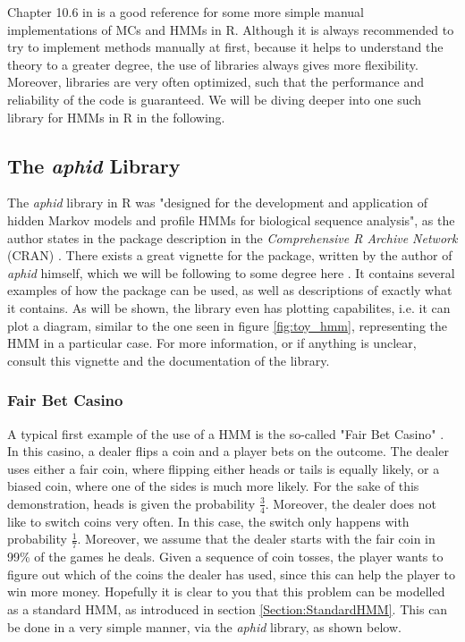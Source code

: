 \documentclass{article}\usepackage[]{graphicx}\usepackage[]{color}
\begin{document}
Chapter 10.6 in \cite{Krijnen2009} is a good reference for some more simple manual implementations of MCs and HMMs in R. Although it is always recommended to try to implement methods manually at first, because it helps to understand the theory to a greater degree, the use of libraries always gives more flexibility. Moreover, libraries are very often optimized, such that the performance and reliability of the code is guaranteed. We will be diving deeper into one such library for HMMs in R in the following. 

\subsection{The \textit{aphid} Library}

The \textit{aphid} library in R was "designed for the development and application of hidden Markov models and profile HMMs for biological sequence analysis", as the author states in the package description in the \textit{Comprehensive R Archive Network} (CRAN) \cite{CRAN}. There exists a great vignette for the package, written by the author of \textit{aphid}  himself, which we will be following to some degree here \cite{Wilkinson2017}. It contains several examples of how the package can be used, as well as descriptions of exactly what it contains. As will be shown, the library even has plotting capabilites, i.e. it can plot a diagram, similar to the one seen in figure \ref{fig:toy_hmm}, representing the HMM in a particular case. For more information, or if anything is unclear, consult this vignette and the documentation of the library. 

\subsubsection{Fair Bet Casino}
A typical first example of the use of a HMM is the so-called "Fair Bet Casino" \cite{Jones2004}. In this casino, a dealer flips a coin and a player bets on the outcome. The dealer uses either a fair coin, where flipping either heads or tails is equally likely, or a biased coin, where one of the sides is much more likely. For the sake of this demonstration, heads is given the probability $\frac34$. Moreover, the dealer does not like to switch coins very often. In this case, the switch only happens with probability $\frac17$. Moreover, we assume that the dealer starts with the fair coin in 99\% of the games he deals. Given a sequence of coin tosses, the player wants to figure out which of the coins the dealer has used, since this can help the player to win more money. Hopefully it is clear to you that this problem can be modelled as a standard HMM, as introduced in section \ref{Section:StandardHMM}. This can be done in a very simple manner, via the \textit{aphid} library, as shown below.   
\end{document}
